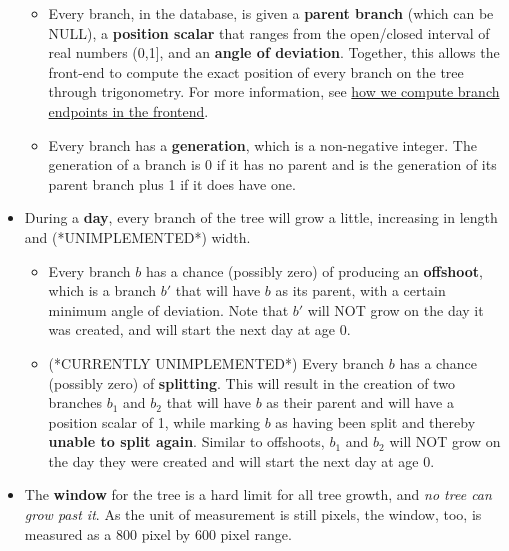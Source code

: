 \begin{itemize}
\begin{itemize}
        \item Every branch, in the database, is given a \textbf{parent branch} (which can be NULL), a \textbf{position scalar} that ranges from the open/closed interval of real numbers (0,1], and an \textbf{angle of deviation}. Together, this allows the front-end to compute the exact position of every branch on the tree through trigonometry. For more information, see \hyperlink{branchpoints}{how we compute branch endpoints in the frontend}.

        \item Every branch has a \textbf{generation}, which is a non-negative integer. The generation of a branch is 0 if it has no parent and is the generation of its parent branch plus 1 if it does have one.
    \end{itemize}

    \item During a \textbf{day}, every branch of the tree will grow a little, increasing in length and (*UNIMPLEMENTED*) width.
    \begin{itemize}
        \item Every branch $b$ has a chance (possibly zero) of producing an \textbf{offshoot}, which is a branch $b'$ that will have $b$ as its parent, with a certain minimum angle of deviation. Note that $b'$ will NOT grow on the day it was created, and will start the next day at age 0.

        \item (*CURRENTLY UNIMPLEMENTED*) Every branch $b$ has a chance (possibly zero) of \textbf{splitting}. This will result in the creation of two branches $b_1$ and $b_2$ that will have $b$ as their parent and will have a position scalar of 1, while marking $b$ as having been split and thereby \textbf{unable to split again}. Similar to offshoots, $b_1$ and $b_2$ will NOT grow on the day they were created and will start the next day at age 0.
    \end{itemize}

    \item The \textbf{window} for the tree is a hard limit for all tree growth, and \textit{no tree can grow past it}. As the unit of measurement is still pixels, the window, too, is measured as a 800 pixel by 600 pixel range.
\end{itemize}
